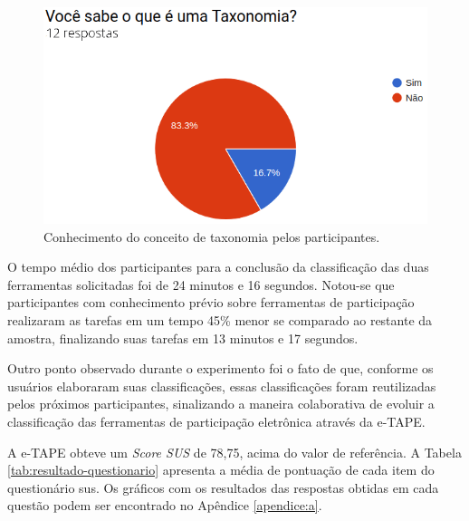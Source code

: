 \begin{figure}[!ht]
    \centering
    \includegraphics[scale=0.4]{./figuras/sabe_taxonomia.png}
    \caption{Conhecimento do conceito de taxonomia pelos participantes.}
    \label{fig:grafico-conhe-taxonomia}
\end{figure}

\par
O tempo médio dos participantes para a conclusão da classificação das duas ferramentas solicitadas foi de 24 minutos e 16 segundos. 
Notou-se que participantes com conhecimento prévio sobre ferramentas de participação realizaram 
as tarefas em um tempo 45\% menor se comparado ao restante da amostra, finalizando suas tarefas em 13 minutos e 17 segundos.

\par 
Outro ponto observado durante o experimento foi o fato de que, conforme os usuários elaboraram suas classificações,
essas classificações foram reutilizadas pelos próximos participantes, sinalizando a maneira colaborativa de evoluir a classificação das ferramentas de participação eletrônica através da e-TAPE.

A e-TAPE obteve um \textit{Score SUS} de 78,75, acima do valor de referência. A Tabela \ref{tab:resultado-questionario} apresenta a média de pontuação de cada item do questionário \acrshort{sus}.
Os gráficos com os resultados das respostas obtidas em cada  questão podem ser encontrado no Apêndice \ref{apendice:a}.

